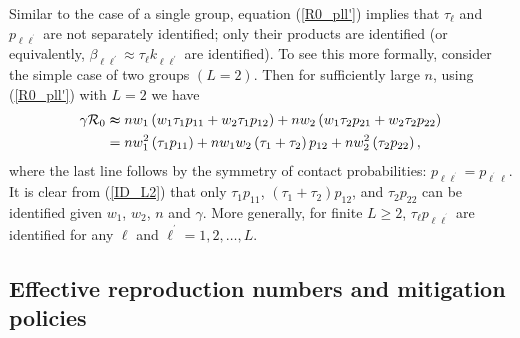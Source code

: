 \documentclass[12pt]{article}
\begin{document}
Similar to the case of a single group, equation (\ref{R0_pll'}) implies that
$\tau_{\ell}$ and $p_{\ell\ell^{^{\prime}}}$ are not separately identified;
only their products are identified (or equivalently, $\beta_{\ell\ell^{\prime
}}\approx\tau_{\ell}k_{\ell\ell^{\prime}}$ are identified). To see this more
formally, consider the simple case of two groups $(L=2)$. Then for
sufficiently large $n$, using (\ref{R0_pll'}) with $L=2$ we have%
\begin{align}
\gamma\mathcal{R}_{0}  &  \thickapprox nw_{1}\left(  w_{1}\tau_{1}p_{11}%
+w_{2}\tau_{1}p_{12}\right)  +nw_{2}\left(  w_{1}\tau_{2}p_{21}+w_{2}\tau
_{2}p_{22}\right) \nonumber\\
&  =nw_{1}^{2}\left(  \tau_{1}p_{11}\right)  +nw_{1}w_{2}\left(  \tau_{1}%
+\tau_{2}\right)  p_{12}+nw_{2}^{2}\left(  \tau_{2}p_{22}\right)  ,
\label{ID_L2}%
\end{align}
where the last line follows by the symmetry of contact probabilities:
$p_{\ell\ell^{^{\prime}}}=p_{\ell^{^{\prime}}\ell}$. It is clear from
(\ref{ID_L2}) that only $\tau_{1}p_{11}$, $\left(  \tau_{1}+\tau_{2}\right)
p_{12}$, and $\tau_{2}p_{22}$ can be identified given $w_{1}$, $w_{2}$, $n$
and $\gamma$. More generally, for finite $L\geq2$, $\tau_{\ell}p_{\ell
\ell^{^{\prime}}}$ are identified for any $\ell$ and $\ell^{^{\prime}%
}=1,2,\ldots,L$.

\subsection{Effective reproduction numbers and mitigation policies}
\end{document}

